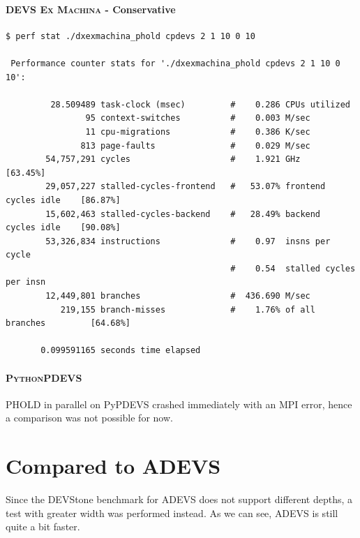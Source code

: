 \documentclass[8pt,a4paper]{report}
\begin{document}
\paragraph{\textsc{DEVS Ex Machina} - Conservative}
\begin{Verbatim}[fontsize=\small]
$ perf stat ./dxexmachina_phold cpdevs 2 1 10 0 10

 Performance counter stats for './dxexmachina_phold cpdevs 2 1 10 0 10':

         28.509489 task-clock (msec)         #    0.286 CPUs utilized          
                95 context-switches          #    0.003 M/sec                  
                11 cpu-migrations            #    0.386 K/sec                  
               813 page-faults               #    0.029 M/sec                  
        54,757,291 cycles                    #    1.921 GHz                     [63.45%]
        29,057,227 stalled-cycles-frontend   #   53.07% frontend cycles idle    [86.87%]
        15,602,463 stalled-cycles-backend    #   28.49% backend  cycles idle    [90.08%]
        53,326,834 instructions              #    0.97  insns per cycle        
                                             #    0.54  stalled cycles per insn
        12,449,801 branches                  #  436.690 M/sec                  
           219,155 branch-misses             #    1.76% of all branches         [64.68%]

       0.099591165 seconds time elapsed
\end{Verbatim}
\paragraph{\textsc{PythonPDEVS}}
PHOLD in parallel on PyPDEVS crashed immediately with an MPI error, hence a comparison was not possible for now.

\section{Compared to \textsc{ADEVS}}
Since the DEVStone benchmark for \textsc{ADEVS} does not support different depths, a test with greater width was performed instead. As we can see, \textsc{ADEVS} is still quite a bit faster.
\end{document}
